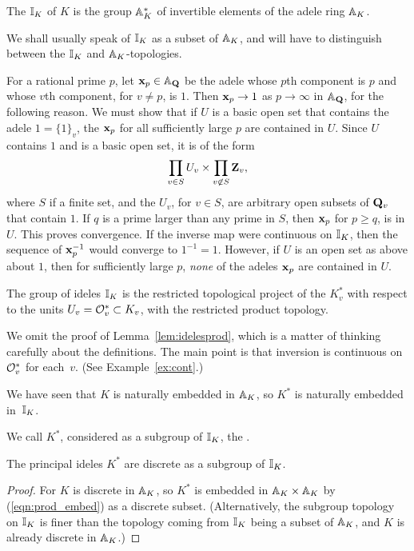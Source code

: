 \begin{definition}
  The  $\II_K$ of $K$ is the group $\AA_K^*$ of invertible
  elements of the adele ring $\AA_K$.
\end{definition}
We shall usually speak of $\II_K$ as a subset of $\AA_K$, and will
have to distinguish between the $\II_K$ and $\AA_K$-topologies.
\begin{example}
For a rational prime $p$, let $\bx_p\in \AA_\Q$ be the adele whose $p$th
component is $p$ and whose $v$th component, for $v\neq p$, is $1$.
Then $\bx_p \to 1$ as $p\to\infty$ in $\AA_\Q$, for the following reason.
We must show that if $U$ is a basic open set that contains the
adele $1=\{1\}_v$, the $\bx_p$ for all sufficiently large $p$
are contained in $U$.  Since $U$ contains $1$ and is a basic
open set, it is of the form 
$$\prod_{v\in S} U_v \times \prod_{v\not\in S} \Z_v,$$
where $S$ if a finite set, and the $U_v$, for $v\in S$, are
arbitrary open subsets of $\Q_v$ that contain $1$.  
If $q$ is a prime larger than any prime in $S$, then 
$\bx_p$ for $p\geq q$, is in $U$.   This proves
convergence.
If the inverse map were continuous on $\II_K$, then 
the sequence of $\bx_p^{-1}$ would converge to $1^{-1}=1$.  
However, if $U$ is an open set as above about $1$, then
for sufficiently large $p$, {\em none} of the adeles $\bx_p$ are
contained in $U$.
\end{example}


\begin{lemma}\label{lem:idelesprod}
The group of ideles $\II_K$ is the restricted topological project
of the $K_v^*$ with respect to the units $U_v=\O_v^*\subset K_v$,
with the restricted product topology.
\end{lemma}
We omit the proof of Lemma~\ref{lem:idelesprod}, which is a
matter of thinking carefully about the definitions.  The main
point is that inversion is continuous on $\O_v^*$ for each~$v$.
(See Example~\ref{ex:cont}.)


We have seen that $K$ is naturally embedded in $\AA_K$, so
$K^*$ is naturally embedded in~$\II_K$.  
\begin{definition}
  We call $K^*$, considered as a subgroup of $\II_K$, the 
.
\end{definition}

\begin{lemma}
The principal ideles $K^*$ are discrete as a subgroup of $\II_K$.
\end{lemma}
\begin{proof}
  For $K$ is discrete in $\AA_K$, so $K^*$ is embedded in $\AA_K\times
  \AA_K$ by (\ref{eqn:prod_embed}) as a discrete subset.
  (Alternatively, the subgroup topology on $\II_K$ is finer than the
  topology coming from $\II_K$ being a subset of $\AA_K$, and $K$ is
  already discrete in $\AA_K$.)
\end{proof}

